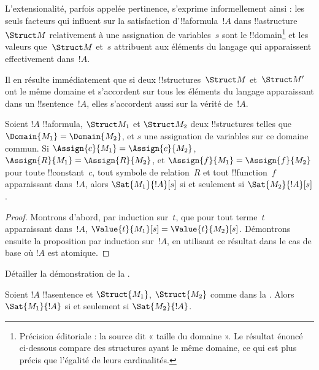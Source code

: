 \documentclass[../../../include/open-logic-section]{subfiles}
\begin{document}


\begin{explain}
L'extensionalité, parfois appelée pertinence, s'exprime
informellement ainsi : les seuls facteurs qui influent sur la
satisfaction d'!!a{formula}~$!A$ dans !!a{structure}~$\Struct M$
relativement à une assignation de variables~$s$ sont le
!!{domain}\footnote{Précision éditoriale : la source dit « taille du domaine ». Le résultat énoncé ci-dessous compare des structures ayant le même domaine, ce qui est plus précis que l'égalité de leurs cardinalités.} et les valeurs que~$\Struct M$ et~$s$ attribuent aux
éléments du langage qui apparaissent effectivement dans~$!A$.

Il en résulte immédiatement que si deux !!{structure}s~$\Struct M$
et~$\Struct M'$ ont le même domaine et s'accordent sur tous les
éléments du langage apparaissant dans un !!{sentence}~$!A$, elles
s'accordent aussi sur la vérité de~$!A$.
\end{explain}

\begin{prop}[Extensionalité]
  Soient $!A$ !!a{formula}, $\Struct M_1$ et $\Struct M_2$ deux
  !!{structure}s telles que $\Domain{M_1} = \Domain{M_2}$, et $s$
  une assignation de variables sur ce domaine commun. Si
  $\Assign{c}{M_1} = \Assign{c}{M_2}$, $\Assign{R}{M_1}=\Assign{R}{M_2}$,
  et $\Assign{f}{M_1} = \Assign{f}{M_2}$ pour toute !!{constant}~$c$,
  tout symbole de relation~$R$ et tout !!{function}~$f$ apparaissant
  dans~$!A$, alors $\Sat{M_1}{!A}[s]$ si et seulement si
  $\Sat{M_2}{!A}[s]$.
\end{prop}

\begin{proof}
  Montrons d'abord, par induction sur~$t$, que pour tout terme~$t$
  apparaissant dans~$!A$,
  $\Value{t}{M_1}[s] = \Value{t}{M_2}[s]$. Démontrons ensuite la
  proposition par induction sur~$!A$, en utilisant ce résultat
  dans le cas de base où $!A$ est atomique.
\end{proof}

\begin{prob}
Détailler la démonstration de la
.
\end{prob}

\begin{cor}
  Soient $!A$ !!a{sentence} et $\Struct{M_1}$, $\Struct{M_2}$
  comme dans la . Alors
  $\Sat{M_1}{!A}$ si et seulement si $\Sat{M_2}{!A}$.
\end{cor}
\end{document}
